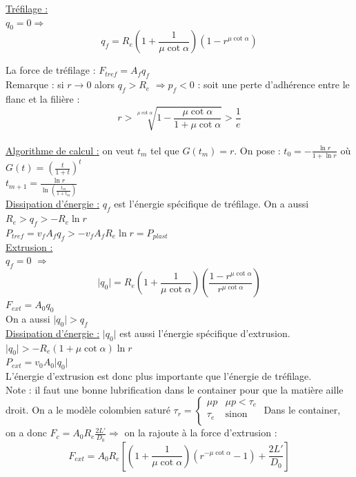 \documentclass[../main.tex]{subfiles}
\begin{document}
\quad \underline{Tréfilage :}\\
$q_0 = 0 \Rightarrow$ \begin{equation}
    q_f = R_e(1+\frac{1}{\mu \cot{\alpha}})(1-r^{\mu \cot{\alpha}})
\end{equation}

La force de tréfilage : $F_{tref} = A_f q_f$\\
\color{gray} Remarque : si $r\rightarrow 0$ alors $q_f>R_e$ $\Rightarrow p_f<0$ : soit une perte d'adhérence entre le flanc et la filière : \begin{equation}
    r > \sqrt[\mu \cot{\alpha}]{1-\frac{\mu \cot{\alpha}}{1+\mu \cot{\alpha}}}> \frac{1}{e}
\end{equation}
\color{black}\\

\underline{Algorithme de calcul :} on veut $t_m$ tel que $G(t_m) = r$. On pose : $t_0 = -\frac{\ln{r}}{1+\ln{r}}$ où $G(t) = (\frac{t}{1+t})^t$\\
$t_{m+1} = \frac{\ln{r}}{\ln(\frac{t_m}{1+t_m})}$\\

\underline{Dissipation d'énergie :} $q_f$ est l'énergie spécifique de tréfilage. On a aussi $R_e>q_f>-R_e \ln{r}$\\
$P_{tref} = v_f A_f q_f >-v_fA_f R_e \ln{r} = P_{plast}$\\

\quad \underline{Extrusion :}\\
$q_f = 0$ $\Rightarrow$\begin{equation}
    \lvert q_0\rvert = R_e (1+\frac{1}{\mu \cot{\alpha}})(\frac{1-r^{\mu \cot{\alpha}}}{r^{\mu \cot{\alpha}}})
\end{equation}
$F_{ext} = A_0 q_0$\\
On a aussi $\lvert q_0 \rvert > q_f$\\

\underline{Dissipation d'énergie :} $\lvert q_0 \rvert $ est aussi l'énergie spécifique d'extrusion. $\lvert q_0 \rvert > -R_e (1+\mu \cot{\alpha}) \ln{r}$\\

$P_{ext} = v_0 A_0 \lvert q_0 \rvert$\\
L'énergie d'extrusion est donc plus importante que l'énergie de tréfilage.\\

\color{gray}Note : il faut une bonne lubrification dans le container pour que la matière aille droit. On a le modèle colombien saturé $\tau_r = \begin{cases}
    \mu p & \mu p<\tau_e\\
    \tau_e & \text{sinon}\\
\end{cases}$
Dans le container, on a donc $F_c = A_0 R_e \frac{2L'}{D_0} \Rightarrow$ on la rajoute à la force d'extrusion : \begin{equation}
    F_{ext} = A_0 R_e [(1+\frac{1}{\mu \cot{\alpha}})(r^{-\mu \cot{\alpha}}-1)+ \frac{2L'}{D_0}]
\end{equation}
\color{black}
\end{document}
